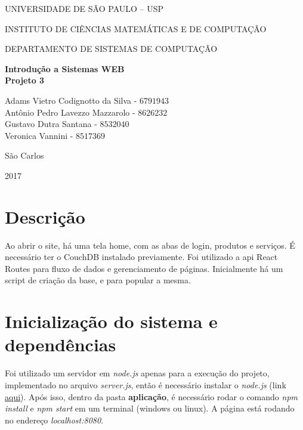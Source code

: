 \documentclass[10pt,a4paper]{article}
\newcommand*\NewPage{\newpage\null\thispagestyle{empty}\newpage}
\begin{document}
\thispagestyle{empty}
\begin{center}
	UNIVERSIDADE DE SÃO PAULO – USP
	
	INSTITUTO DE CIÊNCIAS MATEMÁTICAS E DE COMPUTAÇÃO
	
	DEPARTAMENTO DE SISTEMAS DE COMPUTAÇÃO
	
	\vspace{7cm}
	
	\Large{\textbf{Introdução a Sistemas WEB}}\\
	\small{\textbf{Projeto 3}}
	
	\vspace{6cm}
	
	Adams Vietro Codignotto da Silva - $6791943$ \\ 
	Antônio Pedro Lavezzo Mazzarolo - $8626232$ \\
	Gustavo Dutra Santana - $8532040$\\
	Veronica Vannini - $8517369$\\
	
	\vspace{6cm}
	
	São Carlos
	
	2017
\end{center}

\NewPage
{}

\tableofcontents

\newpage

\section{Descrição}
Ao abrir o site, há uma tela home, com as abas de login, produtos e serviços. É necessário ter o CouchDB instalado previamente. Foi utilizado a api React Routes para fluxo de dados e gerenciamento de páginas. Inicialmente há um script de criação da base, e para popular a mesma.

\section{Inicialização do sistema e dependências}
Foi utilizado um servidor em \textit{node.js} apenas para a execução do projeto, implementado no arquivo \textit{server.js}, então é necessário instalar o \textit{node.js} (link \href{https://nodejs.org/en/}{aqui}). Após isso, dentro da pasta \textbf{aplicação}, é necessário rodar o comando \textit{npm install} e \textit{npm start} em um terminal (windows ou linux). A página está rodando no endereço \textit{localhost:8080}.
\end{document}
